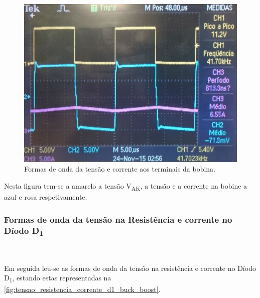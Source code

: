 \documentclass[a4paper,11pt]{article}
\numberwithin{equation}{section}
\begin{document}
\begin{figure}[H]
	\centering
	\includegraphics[keepaspectratio=true, scale=0.14]{img/figs/tensao_corrente_bobina_buck_boost}
	\caption{Formas de onda da tensão e corrente aos terminais da bobina.}
	\label{fig:tensao_corrente_bobina_buck_boost}
	\vspace{-0.8em}
\end{figure}

Nesta figura tem-se a amarelo a tensão V\textsubscript{AK}, a tensão e a corrente na bobine a azul e rosa respetivamente.

\subsubsection{Formas de onda da tensão na Resistência e corrente no Díodo D\textsubscript{1}}\mbox{}\

Em seguida leu-se as formas de onda da tensão na resistência e corrente no Díodo D\textsubscript{1}, estando estas representadas na \autoref{fig:tensao_resistencia_corrente_d1_buck_boost}.
\end{document}
